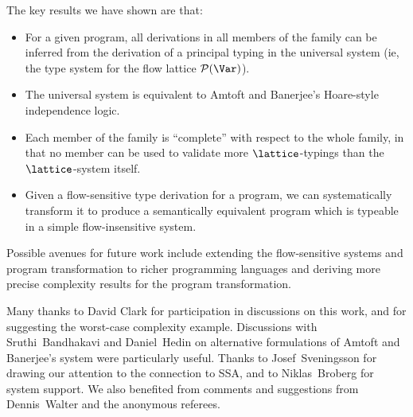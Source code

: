 \documentclass{sigplanconf}
\newcommand{\pset}{\mathcal{P}}
\begin{document}
The key results we have shown are that:
\begin{itemize}
    \item For a given program, all derivations in all members of 
    the family can be inferred from the
    derivation of a principal typing in the universal system (ie, the type system
        for the flow lattice $\pset(\Var)$).

    \item The universal system is
    equivalent to Amtoft and Banerjee's
    Hoare-style independence logic.

    \item Each member of the family is ``complete'' with respect
    to the whole family, in that no member can
    be used to validate more $\lattice$-typings than the $\lattice$-system
    itself.

    \item Given a flow-sensitive type derivation for a program, we can systematically
    transform it to produce a semantically equivalent program
    which is typeable in a simple flow-insensitive system.
\end{itemize}
Possible avenues for future work include extending the flow-sensitive systems and
program transformation to richer programming languages and deriving more precise
complexity results for the program transformation.











\acks
Many thanks to David Clark for participation in 
discussions on this work, and for suggesting 
the worst-case complexity example. Discussions with Sruthi~Bandhakavi and 
Daniel~Hedin on alternative formulations of Amtoft and Banerjee's system were particularly useful. Thanks to Josef~Sveningsson for drawing our attention to the connection to SSA, and to Niklas~Broberg for system support.
We also benefited from comments and suggestions 
from Dennis~Walter and the anonymous referees.
\end{document}
